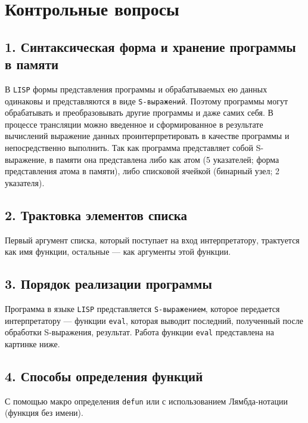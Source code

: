 \clearpage


\section*{Контрольные вопросы}

\subsection*{1. Синтаксическая форма и хранение программы в памяти}

В \texttt{LISP} формы представления программы и обрабатываемых ею данных одинаковы и представляются в виде \texttt{S-выражений}. Поэтому программы могут обрабатывать и преобразовывать другие программы и даже самих себя. В процессе трансляции можно введенное и сформированное в результате вычислений выражение данных проинтерпретировать в качестве программы и непосредственно выполнить. Так как программа представляет собой S-выражение, в памяти она представлена либо как атом (5 указателей; форма представления атома в памяти), либо списковой ячейкой (бинарный узел; 2 указателя).

\subsection*{2. Трактовка элементов списка}

Первый аргумент списка, который поступает на вход интерпретатору, трактуется как имя функции, остальные --- как аргументы этой функции.

\subsection*{3. Порядок реализации программы}

Программа в языке \texttt{LISP} представляется \texttt{S-выражением}, которое передается интерпретатору --- функции \texttt{eval}, которая выводит последний, полученный после обработки S-выражения, результат.
Работа функции \texttt{eval} представлена на картинке ниже.

\subsection*{4. Способы определения функций}

С помощью макро определения \texttt{defun} или с использованием Лямбда-нотации (функция без имени).